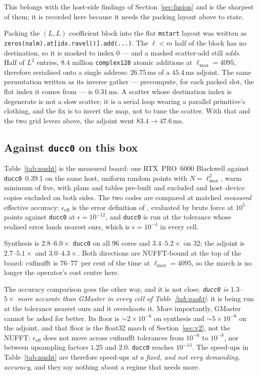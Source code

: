 \documentclass[usenatbib,useAMS]{mnras}
\begin{document}
This belongs with the host-side findings of Section~\ref{sec:fusion} and is the sharpest of them; it is recorded here because it needs the packing layout above to state.

Packing the $(L,L)$ coefficient block into the flat \texttt{mstart} layout was written as \texttt{zeros(nalm).at[idx.ravel()].add(...)}. The $\ell<m$ half of the block has no destination, so it is masked to index $0$ --- and a masked scatter-add still \emph{adds}. Half of $L^2$ entries, $8.4$ million \texttt{complex128} atomic additions at $\ell_{\max}=4095$, therefore serialised onto a single address: $26.75\,\mathrm{ms}$ of a $45.4\,\mathrm{ms}$ adjoint. The same permutation written as its inverse gather --- precompute, for each packed slot, the flat index it comes from --- is $0.31\,\mathrm{ms}$. A scatter whose destination index is degenerate is not a slow scatter; it is a serial loop wearing a parallel primitive's clothing, and the fix is to invert the map, not to tune the scatter. With that and the two grid levers above, the adjoint went $83.4\to47.6\,\mathrm{ms}$.

\subsection{Against \texttt{ducc0} on this box}

Table~\ref{tab:nusht} is the measured board: one RTX~PRO~6000 Blackwell against \texttt{ducc0}~0.39.1 on the same host, uniform random points with $N=\ell_{\max}^2$, warm minimum of five, with plans and tables pre-built and excluded and host--device copies excluded on both sides. The two codes are compared at matched \emph{measured} effective accuracy: $\epsilon_{\mathrm{eff}}$ is the error definition of \citet{belkner2024}, evaluated by brute force at $10^5$ points against \texttt{ducc0} at $\epsilon=10^{-12}$, and \texttt{ducc0} is run at the tolerance whose realised error lands nearest ours, which is $\epsilon=10^{-4}$ in every cell.

Synthesis is $2.8$--$6.0\times$ \texttt{ducc0} on all 96 cores and $3.4$--$5.2\times$ on 32; the adjoint is $2.7$--$5.1\times$ and $3.0$--$4.3\times$. Both directions are NUFFT-bound at the top of the board: cufinufft is $76$--$77$~per cent of the time at $\ell_{\max}=4095$, so the march is no longer the operator's cost centre here.

The accuracy comparison goes the other way, and it is not close. \emph{\texttt{ducc0} is $1.3$--$5\times$ more accurate than GMaster in every cell of Table~\ref{tab:nusht}}: it is being run at the tolerance nearest ours and it overshoots it. More importantly, GMaster cannot be asked for better. Its floor is $\sim2\times10^{-6}$ on synthesis and $\sim5\times10^{-6}$ on the adjoint, and that floor is the float32 march of Section~\ref{sec:v2}, not the NUFFT: $\epsilon_{\mathrm{eff}}$ does not move across cufinufft tolerances from $10^{-6}$ to $10^{-8}$, nor between upsampling factors $1.25$ and $2.0$. \texttt{ducc0} reaches $10^{-13}$. The speed-ups in Table~\ref{tab:nusht} are therefore speed-ups \emph{at a fixed, and not very demanding, accuracy}, and they say nothing about a regime that needs more.
\end{document}
